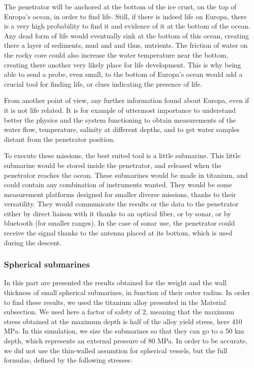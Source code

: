 
The penetrator will be anchored at the bottom of the ice crust, on the top of Europa's ocean, in order to find life. Still, if there is indeed life on Europa, there is a very high probability to find it and evidence of it at the bottom of the ocean. Any dead form of life would eventually sink at the bottom of this ocean, creating there a layer of sediments, mud and and thus, nutrients. The friction of water on the rocky core could also increase the water temperature near the bottom, creating there another very likely place for life development. This is why being able to send a probe, even small, to the bottom of Europa's ocean would add a crucial tool for finding life, or clues indicating the presence of life.


From another point of view, any further information found about Europa, even if it is not life related. It is for example of uttermost importance to understand better the physics and the system functioning to obtain measurements of the water flow, temperature, salinity at different depths, and to get water samples distant from the penetrator position.


To execute these missions, the best suited tool is a little submarine. This little submarine would be stored inside the penetrator, and released when the penetrator  reaches the ocean. These submarines would be made in titanium, and could contain any combination of instruments wanted. They would be some measurement platforms designed for smaller diverse missions, thanks to their versatility. They would communicate the results or the data to the penetrator either by direct liaison with it thanks to an optical fiber, or by sonar, or by bluetooth (for smaller ranges). In the case of sonar use, the penetrator could receive the signal thanks to the antenna placed at its bottom, which is used during the descent.

\subsubsection{Spherical submarines}

In this part are presented the results obtained for the weight and the wall thickness of small spherical submarines, in function of their outer radius. In order to find these results, we used the titanium alloy presented in the Material subsection. We used here a factor of safety of 2, meaning that the maximum stress obtained at the maximum depth is half of the alloy yield stress, here 410 MPa. In this simulation, we size the submarines so that they can go to a 50 km depth, which represents an external pressure of 80 MPa. In order to be accurate, we did not use the thin-walled assumtion for spherical vessels, but the full formulas, defined by the following stresses:

